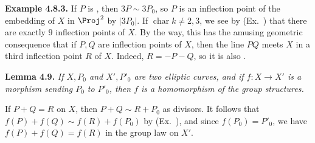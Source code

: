 {\medskip
\noindent\hypertarget{result-IV-4.8.3}{}\textbf{Example 4.8.3.} If $P$ is , then $3P\sim3P_0$, so $P$ is an inflection point of the embedding of $X$ in $\Proj^2$ by $|3P_0|$. If $\operatorname{char}k\ne2,3$, we see by (Ex.~) that there are exactly $9$ inflection points of $X$.  By the way, this has the amusing geometric consequence that if $P,Q$ are \EditionText{}inflection points of $X$, then the line $PQ$ meets $X$ in a third inflection point $R$ of $X$. Indeed, $R=-P-Q$, so it is also .

\medskip
\noindent\hypertarget{result-IV-4.9}{}\textbf{Lemma 4.9.} \emph{If $X,P_0$ and $X',P'_0$ are two elliptic curves, and if $f\colon X\to X'$ is a morphism sending $P_0$ to $P'_0$, then $f$ is a homomorphism of the group structures.}

\Proof \EditionText{}If $P+Q=R$ on $X$, then $P+Q\sim R+P_0$ as divisors. It follows that $f(P)+f(Q)\sim f(R)+f(P_0)$ by (Ex.~), and since $f(P_0)=P'_0$, we have $f(P)+f(Q)=f(R)$ in the group law on $X'$.
}
